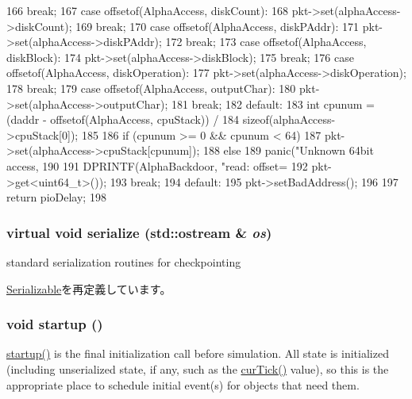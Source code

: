 \begin{DoxyCode}
{{{166                     break;
167                 case offsetof(AlphaAccess, diskCount):
168                     pkt->set(alphaAccess->diskCount);
169                     break;
170                 case offsetof(AlphaAccess, diskPAddr):
171                     pkt->set(alphaAccess->diskPAddr);
172                     break;
173                 case offsetof(AlphaAccess, diskBlock):
174                     pkt->set(alphaAccess->diskBlock);
175                     break;
176                 case offsetof(AlphaAccess, diskOperation):
177                     pkt->set(alphaAccess->diskOperation);
178                     break;
179                 case offsetof(AlphaAccess, outputChar):
180                     pkt->set(alphaAccess->outputChar);
181                     break;
182                 default:
183                     int cpunum = (daddr - offsetof(AlphaAccess, cpuStack)) /
184                                  sizeof(alphaAccess->cpuStack[0]);
185 
186                     if (cpunum >= 0 && cpunum < 64)
187                         pkt->set(alphaAccess->cpuStack[cpunum]);
188                     else
189                         panic("Unknown 64bit access, %
190             }
191             DPRINTF(AlphaBackdoor, "read: offset=%
192                     pkt->get<uint64_t>());
193             break;
194         default:
195           pkt->setBadAddress();
196     }
197     return pioDelay;
198 }
\end{DoxyCode}
\hypertarget{classAlphaBackdoor_ad6272f80ae37e8331e3969b3f072a801}{
\subsubsection[{serialize}]{\setlength{\rightskip}{0pt plus 5cm}virtual void serialize (std::ostream \& {\em os})}}
\label{classAlphaBackdoor_ad6272f80ae37e8331e3969b3f072a801}
standard serialization routines for checkpointing 

\hyperlink{classSerializable_ad6272f80ae37e8331e3969b3f072a801}{Serializable}を再定義しています。\hypertarget{classAlphaBackdoor_aecc7d8debf54990ffeaaed5bac7d7d81}{
\subsubsection[{startup}]{\setlength{\rightskip}{0pt plus 5cm}void startup ()}}
\label{classAlphaBackdoor_aecc7d8debf54990ffeaaed5bac7d7d81}
\hyperlink{classAlphaBackdoor_aecc7d8debf54990ffeaaed5bac7d7d81}{startup()} is the final initialization call before simulation. All state is initialized (including unserialized state, if any, such as the \hyperlink{statistics_8hh_a7acdccbf0d35ce0c159c0cdd36371b22}{curTick()} value), so this is the appropriate place to schedule initial event(s) for objects that need them. 


